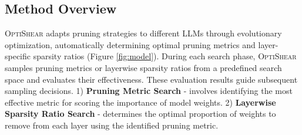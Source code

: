 \subsection{Method Overview}
\textsc{OptiShear} adapts pruning strategies to different LLMs through evolutionary optimization, automatically determining optimal pruning metrics and layer-specific sparsity ratios (Figure \ref{fig:model}).
During each search phase, \textsc{OptiShear} samples pruning metrics or layerwise sparsity ratios from a predefined search space and evaluates their effectiveness. These evaluation results guide subsequent sampling decisions. 
1) \textbf{Pruning Metric Search} - involves identifying the most effective metric for scoring the importance of model weights. 
2) \textbf{Layerwise Sparsity Ratio Search} -  determines the optimal proportion of weights to remove from each layer using the identified pruning metric.
